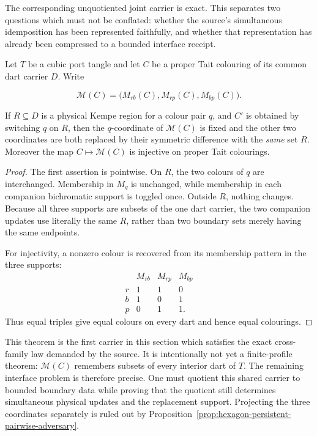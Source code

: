 The corresponding unquotiented joint carrier is exact.  This separates two
questions which must not be conflated: whether the source's simultaneous
idemposition has been represented faithfully, and whether that representation
has already been compressed to a bounded interface receipt.

\begin{theorem}
\label{thm:joint-physical-idemposition}
Let \(T\) be a cubic port tangle and let \(C\) be a proper Tait colouring of
its common dart carrier \(D\).  Write

\[
 \mathcal M(C)=\bigl(M_{rb}(C),M_{rp}(C),M_{bp}(C)\bigr).
\]

If \(R\subseteq D\) is a physical Kempe region for a colour pair \(q\), and
\(C'\) is obtained by switching \(q\) on \(R\), then the \(q\)-coordinate of
\(\mathcal M(C)\) is fixed and the other two coordinates are both replaced by
their symmetric difference with the \emph{same} set \(R\).  Moreover the map
\(C\mapsto\mathcal M(C)\) is injective on proper Tait colourings.

\end{theorem}

\begin{proof}
The first assertion is pointwise.  On \(R\), the two colours of \(q\) are
interchanged.  Membership in \(M_q\) is unchanged, while membership in each
companion bichromatic support is toggled once.  Outside \(R\), nothing
changes.  Because all three supports are subsets of the one dart carrier, the
two companion updates use literally the same \(R\), rather than two boundary
sets merely having the same endpoints.

For injectivity, a nonzero colour is recovered from its membership pattern in
the three supports:
\[
\begin{array}{c|ccc}
 &M_{rb}&M_{rp}&M_{bp}\\ \hline
r&1&1&0\\
b&1&0&1\\
p&0&1&1.
\end{array}
\]
Thus equal triples give equal colours on every dart and hence equal
colourings.
\end{proof}

This theorem is the first carrier in this section which satisfies the exact
cross-family law demanded by the source.  It is intentionally not yet a
finite-profile theorem: \(\mathcal M(C)\) remembers subsets of every interior
dart of \(T\).  The remaining interface problem is therefore precise.  One
must quotient this shared carrier to bounded boundary data while proving that
the quotient still determines simultaneous physical updates and the
replacement support.  Projecting the three coordinates separately is ruled
out by Proposition~\ref{prop:hexagon-persistent-pairwise-adversary}.

